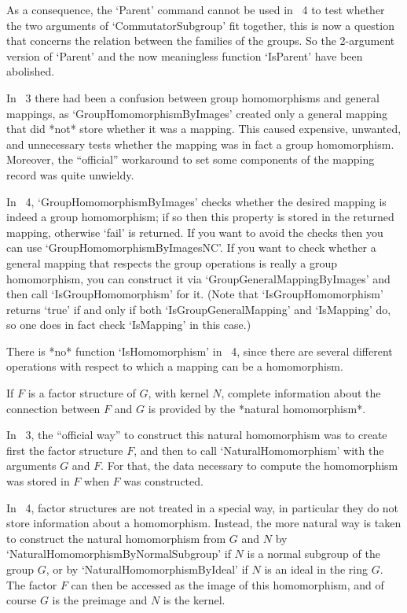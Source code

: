 As a consequence, the `Parent' command cannot be used in {\GAP}~4 to
test whether the two arguments of `CommutatorSubgroup' fit together,
this is now a question that concerns the relation between the families
of the groups.  So the 2-argument version of `Parent' and the now
meaningless function `IsParent' have been abolished.



In {\GAP}~3 there had been a confusion between group homomorphisms and
general mappings, as `GroupHomomorphismByImages' created only a
general mapping that did *not* store whether it was a mapping.  This
caused expensive, unwanted, and unnecessary tests whether the mapping
was in fact a group homomorphism.  Moreover, the ``official''
workaround to set some components of the mapping record was quite
unwieldy.

In {\GAP}~4, `GroupHomomorphismByImages' checks whether the desired
mapping is indeed a group homomorphism; if so then this property is
stored in the returned mapping, otherwise `fail' is returned.  If you
want to avoid the checks then you can use
`GroupHomomorphismByImagesNC'.  If you want to check whether a general
mapping that respects the group operations is really a group
homomorphism, you can construct it via `GroupGeneralMappingByImages'
and then call `IsGroupHomomorphism' for it.  (Note that
`IsGroupHomomorphism' returns `true' if and only if both
`IsGroupGeneralMapping' and `IsMapping' do, so one does in fact check
`IsMapping' in this case.)

There is *no* function `IsHomomorphism' in {\GAP}~4,
since there are several different operations with respect to which a
mapping can be a homomorphism.



If $F$ is a factor structure of $G$, with kernel $N$, complete
information about the connection between $F$ and $G$ is provided by
the *natural homomorphism*.

In {\GAP}~3, the ``official way'' to construct this natural homomorphism
was to create first the factor structure $F$, and then to call
`NaturalHomomorphism' with the arguments $G$ and $F$.
For that, the data necessary to compute the homomorphism was stored in
$F$ when $F$ was constructed.

In {\GAP}~4, factor structures are not treated in a special way,
in particular they do not store information about a homomorphism.
Instead, the more natural way is taken to construct the natural
homomorphism from $G$ and $N$ by `NaturalHomomorphismByNormalSubgroup'
if $N$ is a normal subgroup of the group $G$,
or by `NaturalHomomorphismByIdeal' if $N$ is an ideal in the ring $G$.
The factor $F$ can then be accessed as the image of this homomorphism,
and of course $G$ is the preimage and $N$ is the kernel.


